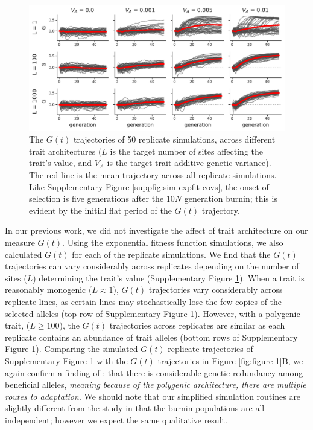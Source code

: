 \documentclass[11pt]{article}
\newcommand{\vb}[1]{{\it \color{blue} #1}}
\begin{document}
\begin{figure}[!ht]
  \centering
  \includegraphics[width=\textwidth]{figures/fig-architecture-G.pdf}

  \caption{The $G(t)$ trajectories of 50 replicate simulations, across
    different trait architectures ($L$ is the target number of sites affecting
    the trait's value, and $V_A$ is the target trait additive genetic
    variance). The red line is the mean trajectory across all replicate
  simulations. Like Supplementary Figure \ref{suppfig:sim-expfit-covs}, the
onset of selection is five generations after the $10N$ generation burnin; this
is evident by the initial flat period of the $G(t)$ trajectory.}

  \label{suppfig:sim-expfit-Gs}
\end{figure}

In our previous work, we did not investigate the affect of trait architecture
on our measure $G(t)$. Using the exponential fitness function simulations, we
also calculated $G(t)$ for each of the replicate simulations. We find that the
$G(t)$ trajectories can vary considerably across replicates depending on the
number of sites ($L$) determining the trait's value (Supplementary Figure
\ref{suppfig:sim-expfit-Gs}). When a trait is reasonably monogenic ($L \approx
1$), $G(t)$ trajectories vary considerably across replicate lines, as certain
lines may stochastically lose the few copies of the selected alleles (top row
of Supplementary Figure \ref{suppfig:sim-expfit-Gs}). However, with a polygenic
trait, ($L \ge 100$), the $G(t)$ trajectories across replicates are similar as
each replicate contains an abundance of trait alleles (bottom rows of
Supplementary Figure \ref{suppfig:sim-expfit-Gs}). Comparing the simulated
$G(t)$ replicate trajectories of Supplementary Figure
\ref{suppfig:sim-expfit-Gs} with the \textcite{Barghi2019-qy} $G(t)$
trajectories in Figure \ref{fig:figure-1}B, we again confirm a finding of
\textcite{Barghi2019-qy}: that there is considerable genetic redundancy among
beneficial alleles, \vb{meaning because of the polygenic architecture, there
are multiple routes to adaptation}. We should note that our simplified
simulation routines are slightly different from the \textcite{Barghi2019-qy}
study in that the burnin populations are all independent; however we expect the
same qualitative result. 
\end{document}
